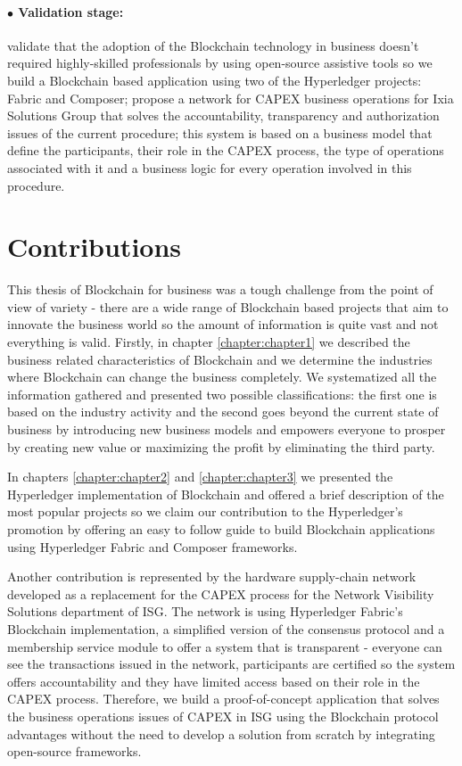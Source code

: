 \paragraph{$\bullet$ Validation stage:} validate that the adoption of the Blockchain technology in business doesn't required highly-skilled professionals by using open-source assistive tools so we build a Blockchain based application using two of the Hyperledger projects: Fabric and Composer; propose a network for CAPEX business operations for Ixia Solutions Group that solves the accountability, transparency and authorization issues of the current procedure; this system is based on a business model that define the participants, their role in the CAPEX process, the type of operations associated with it and a business logic for every operation involved in this procedure.

\section{Contributions}
\label{sec:intro-sec3}
This thesis of Blockchain for business was a tough challenge from the point of view of variety - there are a wide range of Blockchain based projects that aim to innovate the business world so the amount of information is quite vast and not everything is valid. Firstly, in chapter \ref{chapter:chapter1} we described the business related characteristics of Blockchain and we determine the industries where Blockchain can change the business completely. We systematized all the information gathered and presented two possible classifications: the first one is based on the industry activity and the second goes beyond the current state of business by introducing new business models and empowers everyone to prosper by creating new value or maximizing the profit by eliminating the third party.  

In chapters \ref{chapter:chapter2} and \ref{chapter:chapter3} we presented the Hyperledger implementation of Blockchain and offered a brief description of the most popular projects so we claim our contribution to the Hyperledger's promotion by offering an easy to follow guide to build Blockchain applications using Hyperledger Fabric and Composer frameworks.

Another contribution is represented by the hardware supply-chain network developed as a replacement for the CAPEX process for the Network Visibility Solutions department of ISG. The network is using Hyperledger Fabric's Blockchain implementation, a simplified version of the consensus protocol and a membership service module to offer a system that is transparent - everyone can see the transactions issued in the network, participants are certified so the system offers accountability and they have limited access based on their role in the CAPEX process. Therefore, we build a proof-of-concept application that solves the business operations issues of CAPEX in ISG using the Blockchain protocol advantages without the need to develop a solution from scratch by integrating open-source frameworks.

